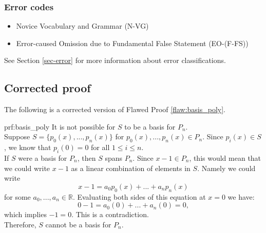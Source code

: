 \subsubsection{Error codes}
\begin{itemize}
    \item Novice Vocabulary and Grammar (N-VG)
    \item Error-caused Omission due to Fundamental False Statement (EO-(F-FS))
\end{itemize}
See Section \ref{sec-error} for more information about error classifications.

\clearpage
\subsection{Corrected proof}

The following is a corrected version of Flawed Proof \ref{flaw:basis_poly}. %

\begin{prf}{prf:basis_poly} %
It is not possible for $S$ to be a basis for $P_n$. \\

Suppose $S = \{p_0(x), ..., p_{n}(x)\}$ for $p_0(x), ..., p_{n}(x) \in P_n$. Since $p_i(x)\in S$, we know that $p_i(0)=0$ for all $1\leq i \leq n$.  \\

If $S$ were a basis for $P_n$, then $S$ spans $P_n$. Since $x-1\in P_n$, this would mean that we could write $x-1$ as a linear combination of elements in $S$. Namely we could write \[x-1 = a_0p_0(x) + ... + a_{n}p_n(x)\] for some $a_0, ..., a_n \in \mathbb{R}$. Evaluating both sides of this equation at $x = 0$ we have:
\[0-1 = a_0(0) + ... + a_n(0) = 0,\] which implies $-1=0$. This is a contradiction. \\

Therefore, $S$ cannot be a basis for $P_n$.
\end{prf} 